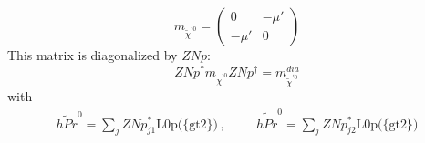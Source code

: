 \begin{itemize}
\begin{equation} 
m_{\tilde{\chi}^{'0}} = \left( 
\begin{array}{cc}
0 &- \mu' \\ 
- \mu'  &0\end{array} 
\right) 
 \end{equation} 
This matrix is diagonalized by \(ZNp\): 
\begin{equation} 
ZNp^* m_{\tilde{\chi}^{'0}} ZNp^{\dagger} = m^{dia}_{\tilde{\chi}^{'0}} 
\end{equation} 
with 
\begin{align} 
\tilde{hPr}^{0} = \sum_{j}ZNp^*_{j 1}\text{L0p}\Big(\{\text{gt2}\}\Big)\,, \hspace{1cm} 
\tilde{\bar{hPr}}^{0} = \sum_{j}ZNp^*_{j 2}\text{L0p}\Big(\{\text{gt2}\}\Big)
\end{align} 
\end{itemize} 
